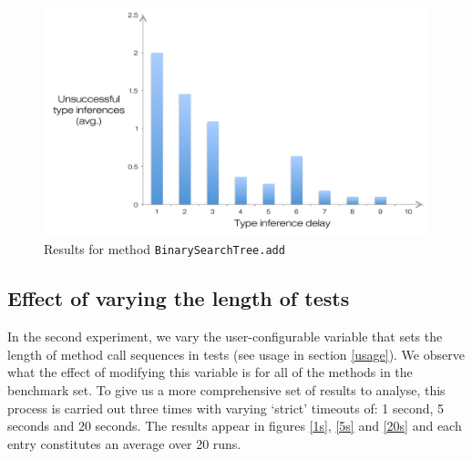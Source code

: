 \begin{figure}[h]
\hspace*{-0.5cm}
\centering
\includegraphics[scale=0.55]{./components/chapter7/bst.pdf}
\caption{Results for method \texttt{BinarySearchTree.add}}
\label{bstbench}
\end{figure}

\subsection{Effect of varying the length of tests}
In the second experiment, we vary the user-configurable variable that sets the length of method call sequences in tests (see usage in section \ref{usage}). We observe what the effect of modifying this variable is for all of the methods in the benchmark set. To give us a more comprehensive set of results to analyse, this process is carried out three times with varying `strict' timeouts of: 1 second, 5 seconds and 20 seconds. The results appear in figures \ref{1s}, \ref{5s} and \ref{20s} and each entry constitutes an average over 20 runs.

